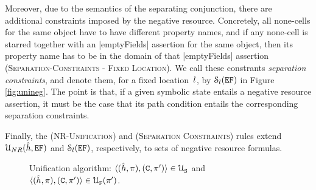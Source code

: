 Moreover, due to the semantics of the separating conjunction, there are additional  constraints imposed by the negative resource. Concretely, all none-cells for the same object have to have different property names, and if any none-cell is starred together with an \jsinline|emptyFields| assertion for the same object, then its property name has to be in the domain of that \jsinline|emptyFields| assertion (\textsc{Separation-Constraints - Fixed Location}). 
We call these constrants \emph{separation constraints}, and denote them, for a fixed location~$l$, by ${\cal S}_{l}(\mathtt{EF})$ in Figure \ref{fig:unineg}. The point is that, if a given symbolic state entails a negative resource assertion, it must be the case that its path condition entails the corresponding separation constraints.

Finally, the (\textsc{NR-Unification}) and (\textsc{Separation Constraints}) rules extend ${\cal U}_{NR}(\hat{h}, \mathtt{EF})$ and ${\cal S}_{l}(\mathtt{EF})$, respectively, to sets of negative resource formulas.

\begin{figure}[t!]
{\scriptsize
\centering
{}}
\vspace*{-0.6cm}
\caption{Unification algorithm: {\small $\langle (\hat{h}, \pi), (\mathtt{C}, \pi') \rangle \in {\cal U}_{\mathtt{S}}^{}$}
and {\small $\langle (\hat{h}, \pi), (\mathtt{C}, \pi') \rangle \in {\cal U}_{\mathtt{F}}^{}(\pi')$}.\label{unification:algorithm}}
\vspace*{-0.3cm}
\end{figure}

